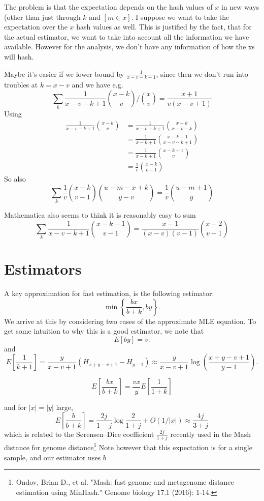 The problem is that the expectation depends on the hash values of $x$ in new ways (other than just through $k$ and $[m\in x]$.
I suppose we want to take the expectation over the $x$ hash values as well.
This is justified by the fact, that for the actual estimator, we want to take into account all the information we have available.
However for the analysis, we don't have any information of how the xs will hash.

Maybe it's easier if we lower bound by $\frac{1}{x-v-k+1}$, since then we don't run into troubles at $k=x-v$ and we have e.g.
\[
   \sum_k\frac1{x-v-k+1}\binom{x-k}{v}\bigg/\binom{x}{v} = \frac{x+1}{v(x-v+1)}
\]
Using
\begin{align}
   \frac1{x-v-k+1}\binom{x-k}{v}
   &=
   \frac1{x-v-k+1}\binom{x-k}{x-v-k}
 \\&=
   \frac1{x-k+1}\binom{x-k+1}{x-v-k+1}
 \\&=
   \frac1{x-k+1}\binom{x-k+1}{v}
 \\&=
   \frac1{v}\binom{x-k}{v-1}
\end{align}
So also
\[
   \sum_k \frac1v\binom{x-k}{v-1}\binom{u-m-x+k}{y-v}
   = \frac1v\binom{u-m+1}{y}
\]

Mathematica also seems to think it is reasonably easy to sum
\[
   \sum_k\frac1{x-v-k+1}\binom{x-k-1}{v-1}\bigg = \frac{x-1}{(x-v)(v-1)}\binom{x-2}{v-1}
\]

\section{Estimators}

A key approximation for fast estimation, is the following estimator:
\[
   \min\left\{\frac{bx}{b+k}, by\right\}.
\]
We arrive at this by considering two cases of the approximate MLE equation.
To get some intuition to why this is a good estimator, we note that
\[
   E\left[by\right] = v.
\]
and 
\[
   E\left[\frac1{k+1}\right] = \frac{y}{x-v+1}(H_{x+y-v+1}-H_{y-1})
   \approx \frac{y}{x-v+1}\log\left(\frac{x+y-v+1}{y-1}\right).
\]

\[
   E\left[\frac{bx}{b+k}\right] = \frac{vx}{y}E\left[\frac1{1+k}\right]
\]

and for $|x|=|y|$ large,
\[
   E\left[\frac{b}{b+k}\right] = \frac{2j}{1-j}\log\frac2{1+j} + O(1/|x|) \approx \frac{4j}{3+j}
\]
which is related to the Sørensen–Dice coefficient $\frac{2j}{1+j}$ recently used in the Mash distance for genome distance\footnote{ Ondov, Brian D., et al. "Mash: fast genome and metagenome distance estimation using MinHash." Genome biology 17.1 (2016): 1-14.}
Note however that this expectation is for a single sample, and our estimator uses $b$ 

